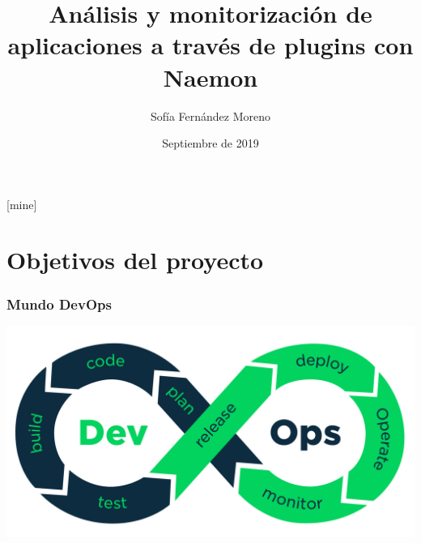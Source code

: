 \documentclass{beamer}
\title[]{Análisis y monitorización de aplicaciones a través de plugins con Naemon} %
\author{Sofía Fernández Moreno} %
\institute[UGR] %
{
  Universidad de Granada \\ %
}
\date{Septiembre de 2019} %
\theoremstyle{plain}
\theoremstyle{definition}
\theoremstyle{plain}
\theoremstyle{definition}
\theoremstyle{remark}
\theoremstyle{definition}
\begin{document}
\theoremstyle{definition}
[mine]

\frame{\titlepage}




\section{Objetivos del proyecto} %
\begin{frame}
	\frametitle{Mundo DevOps}
\centering
\includegraphics[scale=0.1]{imagenes/devops.png}	
\end{frame}
\end{document}
